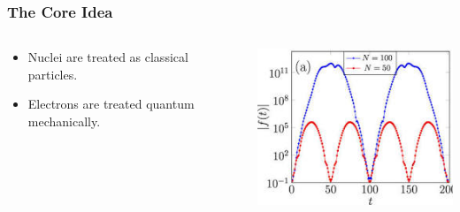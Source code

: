 \begin{frame}
    \frametitle{The Core Idea}
     \begin{columns}[T]
        \begin{column}{0.5\textwidth}
            \vspace{2cm}
            \begin{itemize}
                \item Nuclei are treated as classical particles.
                \item Electrons are treated quantum mechanically.
            \end{itemize}
        \end{column}
        \begin{column}{0.5\textwidth}
            \includegraphics[width=\textwidth]{images/ehrenfest1.png}
        \end{column}
    \end{columns}
\end{frame}

